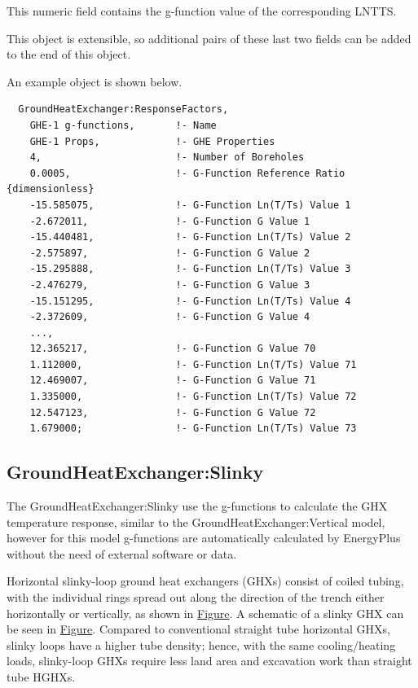 This numeric field contains the g-function value of the corresponding LNTTS.

This object is extensible, so additional pairs of these last two fields can be added to the end of this object.

An example object is shown below.

\begin{lstlisting}
  GroundHeatExchanger:ResponseFactors,
    GHE-1 g-functions,       !- Name
    GHE-1 Props,             !- GHE Properties
    4,                       !- Number of Boreholes
    0.0005,                  !- G-Function Reference Ratio {dimensionless}
    -15.585075,              !- G-Function Ln(T/Ts) Value 1
    -2.672011,               !- G-Function G Value 1
    -15.440481,              !- G-Function Ln(T/Ts) Value 2
    -2.575897,               !- G-Function G Value 2
    -15.295888,              !- G-Function Ln(T/Ts) Value 3
    -2.476279,               !- G-Function G Value 3
    -15.151295,              !- G-Function Ln(T/Ts) Value 4
    -2.372609,               !- G-Function G Value 4
    ...,
    12.365217,               !- G-Function G Value 70
    1.112000,                !- G-Function Ln(T/Ts) Value 71
    12.469007,               !- G-Function G Value 71
    1.335000,                !- G-Function Ln(T/Ts) Value 72
    12.547123,               !- G-Function G Value 72
    1.679000;                !- G-Function Ln(T/Ts) Value 73
\end{lstlisting}

\subsection{GroundHeatExchanger:Slinky}\label{groundheatexchangerslinky}

The GroundHeatExchanger:Slinky use the g-functions to calculate the GHX temperature response, similar to the GroundHeatExchanger:Vertical model, however for this model g-functions are automatically calculated by EnergyPlus without the need of external software or data.

Horizontal slinky-loop ground heat exchangers (GHXs) consist of coiled tubing, with the individual rings spread out along the direction of the trench either horizontally or vertically, as shown in \protect\hyperlink{SlinkyIOFig1}{Figure}. A schematic of a slinky GHX can be seen in \protect\hyperlink{SlinkyIOFig2}{Figure}. Compared to conventional straight tube horizontal GHXs, slinky loops have a higher tube density; hence, with the same cooling/heating loads, slinky-loop GHXs require less land area and excavation work than straight tube HGHXs.

